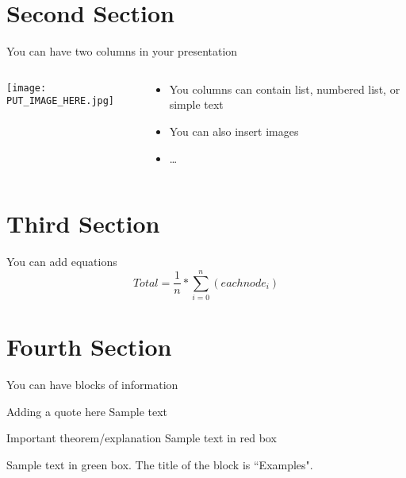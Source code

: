 \documentclass[15pt, xcolor=dvipsnames]{beamer}
\begin{document}

\section{Second Section}

\begin{frame}{You can have two columns in your presentation}
\begin{columns}
\begin{column}{0.48\linewidth}
\begin{center}
   \texttt{[image: PUT\_IMAGE\_HERE.jpg]}
\end{center}
\end{column}

\begin{column}{0.48\linewidth}
    \begin{itemize} %
        \item You columns can contain list, numbered list, or simple text 
        \item You can also insert images
        \item \ldots
    \end{itemize}
\end{column}
\end{columns}
\end{frame}

\section{Third Section}
\begin{frame}{You can add equations}
    \begin{equation}
         Total = \frac{1}{n}*\sum_{i=0}^n (eachnode_i)
    \end{equation}
\end{frame}

\section{Fourth Section}
\begin{frame}{You can have blocks of information}

\begin{block}{Adding a quote here}
Sample text
\end{block}

\begin{alertblock}{Important theorem/explanation}
Sample text in red box
\end{alertblock}

\begin{examples}
Sample text in green box. The title of the block is ``Examples".
\end{examples}

\end{frame}
\end{document}
